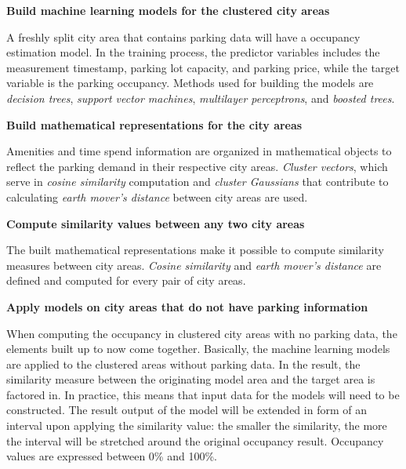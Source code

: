 \begin{romanlist}
		\item{\textbf{Build machine learning models for the clustered city areas}}
		
		\noindent A freshly split city area that contains parking data will have a occupancy estimation model. In the training process, the predictor variables includes the measurement timestamp, parking lot capacity, and parking price, while the target variable is the parking occupancy. Methods used for building the models are \textit{decision trees}, \textit{support vector machines}, \textit{multilayer perceptrons}, and \textit{boosted trees}.
		
		\item{\textbf{Build mathematical representations for the city areas}}
		
		\noindent Amenities and time spend information are organized in mathematical objects to reflect the parking demand in their respective city areas. \textit{Cluster vectors}, which serve in \textit{cosine similarity} computation and \textit{cluster Gaussians} that contribute to calculating \textit{earth mover's distance} between city areas are used.

		\item{\textbf{Compute similarity values between any two city areas}}
		
		\noindent The built mathematical representations make it possible to compute similarity measures between city areas. \textit{Cosine similarity} and \textit{earth mover's distance} are defined and computed for every pair of city areas.
		
		\item{\textbf{Apply models on city areas that do not have parking information}}
		
		\noindent When computing the occupancy in clustered city areas with no parking data, the elements built up to now come together. Basically, the machine learning models are applied to the clustered areas without parking data. In the result, the similarity measure between the originating model area and the target area is factored in. In practice, this means that input data for the models will need to be constructed. The result output of the model will be extended in form of an interval upon applying the similarity value: the smaller the similarity, the more the interval will be stretched around the original occupancy result. Occupancy values are expressed between 0\% and 100\%.
		
	\end{romanlist}
	
